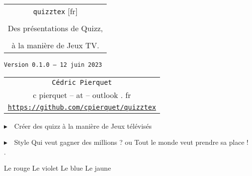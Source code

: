 \documentclass[french,a4paper,11pt]{article}
\def\TPversion{0.1.0}
\def\TPdate{12 juin 2023}
\begin{document}
\setlength{\aweboxleftmargin}{0.07\linewidth}
\setlength{\aweboxcontentwidth}{0.93\linewidth}
\setlength{\aweboxvskip}{8pt}

\pagestyle{fancy}

\thispagestyle{empty}

\vspace{2cm}

\begin{center}
	\begin{minipage}{0.75\linewidth}
	\begin{tcolorbox}[colframe=yellow,colback=yellow!15]
		\begin{center}
			\begin{tabular}{c}
				{\Huge \texttt{quizztex} [fr]}\\
				\\
				{\LARGE Des présentations de Quizz,} \\
				\\
				{\LARGE à la manière de Jeux TV.} \\
			\end{tabular}
			
			\bigskip
			
			{\small \texttt{Version \TPversion{} -- \TPdate}}
		\end{center}
	\end{tcolorbox}
\end{minipage}
\end{center}

\begin{center}
	\begin{tabular}{c}
	\texttt{Cédric Pierquet}\\
	{\ttfamily c pierquet -- at -- outlook . fr}\\
	\texttt{\url{https://github.com/cpierquet/quizztex}}
\end{tabular}
\end{center}

\vspace{0.25cm}

{$\blacktriangleright$~~Créer des quizz à la manière de Jeux télévisés}

\vspace{0.25cm}

{$\blacktriangleright$~~Style \og Qui veut gagner des millions ? \fg{} ou \og Tout le monde veut prendre sa place ! \fg{}.}

\vspace{1cm}

\hfill{}
{Le rouge} {Le violet}
{Le blue} {Le jaune}\hfill~
\end{document}
